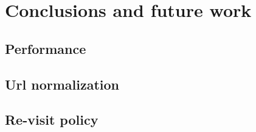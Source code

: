 
\chapter{Conclusions and future work} %

\label{Chapter6} %



\section{Performance}
\section{Url normalization}
\section{Re-visit policy}

